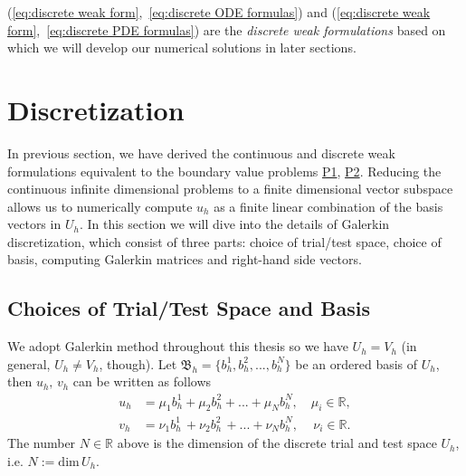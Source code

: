 	(\ref{eq:discrete weak form},~\ref{eq:discrete ODE formulas}) and 
	(\ref{eq:discrete weak form},~\ref{eq:discrete PDE formulas}) are the
	\emph{discrete weak formulations} based on which we will develop our
	numerical solutions in later sections.
	
	
	\section{Discretization} \label{section.2}
	In previous section, we have derived the continuous and discrete
	weak formulations equivalent to the boundary value problems
	\hyperlink{P1}{P1}, \hyperlink{P2}{P2}. Reducing the continuous 
	infinite dimensional problems to a finite dimensional vector subspace 
	allows us to numerically compute $u_h$ as a finite linear combination
	of the basis vectors in $U_h$. In this section we will
	dive into the details of Galerkin discretization, which consist of three
	parts: choice of trial/test space, choice of basis, computing Galerkin 
	matrices and right-hand side vectors.	
		 
	\subsection{Choices of Trial/Test Space and Basis}\label{subsection.2.1}
	We adopt Galerkin method throughout this thesis so we have
	$U_h=V_h$ (in general, $U_h\neq V_h$, though).
	Let $\mathfrak{B}_h=\{b_h^1, b_h^2, ..., b_h^N \}$	be an ordered
	basis of $U_h$, then $u_h,\,v_h$ can be written as follows
	\begin{align}
	u_h&=\mu_1 b_h^1+\mu_2 b_h^2+...+\mu_N b_h^N, \quad\mu_i\in\mathbb{R},
	\label{eq:linear combi of u_h}\\	
	v_h&=\nu_1 b_h^1\,+\nu_2 b_h^2\,+...+\nu_N b_h^N,\,\quad\nu_i\in\mathbb{R}.
	\label{eq:linear combi of v_h}	
	\end{align}
	The number $N\in \mathbb{R}$ above is the dimension of the discrete
	trial and test space $U_h$, i.e. $N:=\mathrm{dim}\,U_h$.	
	
